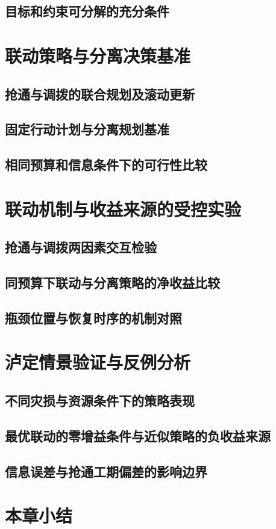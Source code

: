 \subsection{目标和约束可分解的充分条件}

\ThesisBlank

\section{联动策略与分离决策基准}
\subsection{抢通与调拨的联合规划及滚动更新}
\subsection{固定行动计划与分离规划基准}
\subsection{相同预算和信息条件下的可行性比较}

\ThesisBlank

\section{联动机制与收益来源的受控实验}
\subsection{抢通与调拨两因素交互检验}
\subsection{同预算下联动与分离策略的净收益比较}
\subsection{瓶颈位置与恢复时序的机制对照}

\ThesisBlank

\section{泸定情景验证与反例分析}
\subsection{不同灾损与资源条件下的策略表现}
\subsection{最优联动的零增益条件与近似策略的负收益来源}
\subsection{信息误差与抢通工期偏差的影响边界}

\ThesisBlank

\section{本章小结}
\ThesisBlank
